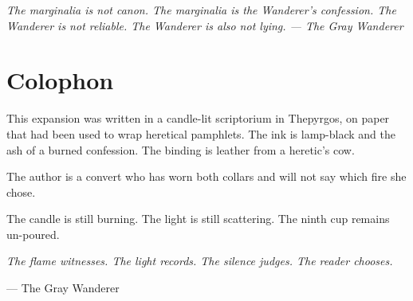 \documentclass{book}
\newcommand{\citation}[1]{\textcolor{marginalia}{\small\textit{#1}}}
\begin{document}
\citation{The marginalia is not canon. The marginalia is the Wanderer's confession. The Wanderer is not reliable. The Wanderer is also not lying. --- The Gray Wanderer}

\chapter*{Colophon}

This expansion was written in a candle-lit scriptorium in Thepyrgos, on paper that had been used to wrap heretical pamphlets. The ink is lamp-black and the ash of a burned confession. The binding is leather from a heretic's cow.

The author is a convert who has worn both collars and will not say which fire she chose.

The candle is still burning. The light is still scattering. The ninth cup remains un-poured.

\citation{The flame witnesses. The light records. The silence judges. The reader chooses.}

\noindent --- The Gray Wanderer
\end{document}
